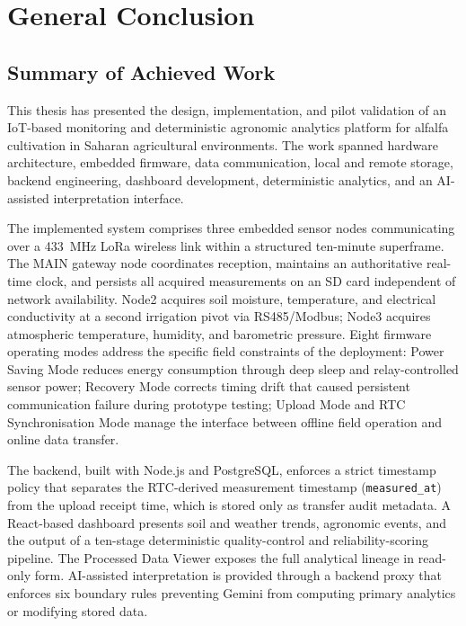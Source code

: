 
\chapter*{General Conclusion}
\label{chap:general-conclusion}

\section*{Summary of Achieved Work}

This thesis has presented the design, implementation, and pilot validation of an
IoT-based monitoring and deterministic agronomic analytics platform for alfalfa
cultivation in Saharan agricultural environments. The work spanned hardware
architecture, embedded firmware, data communication, local and remote storage,
backend engineering, dashboard development, deterministic analytics, and an
AI-assisted interpretation interface.

The implemented system comprises three embedded sensor nodes communicating over
a 433~MHz LoRa wireless link within a structured ten-minute superframe. The MAIN
gateway node coordinates reception, maintains an authoritative real-time clock, and
persists all acquired measurements on an SD card independent of network availability.
Node2 acquires soil moisture, temperature, and electrical conductivity at a second
irrigation pivot via RS485/Modbus; Node3 acquires atmospheric temperature, humidity,
and barometric pressure. Eight firmware operating modes address the specific field
constraints of the deployment: Power Saving Mode reduces energy consumption through
deep sleep and relay-controlled sensor power; Recovery Mode corrects timing drift
that caused persistent communication failure during prototype testing; Upload Mode
and RTC Synchronisation Mode manage the interface between offline field operation
and online data transfer.

The backend, built with Node.js and PostgreSQL, enforces a strict timestamp policy
that separates the RTC-derived measurement timestamp (\texttt{measured\_at}) from
the upload receipt time, which is stored only as transfer audit metadata. A
React-based dashboard presents soil and weather trends, agronomic events, and the
output of a ten-stage deterministic quality-control and reliability-scoring pipeline.
The Processed Data Viewer exposes the full analytical lineage in read-only form.
AI-assisted interpretation is provided through a backend proxy that enforces six
boundary rules preventing Gemini from computing primary analytics or modifying
stored data.


